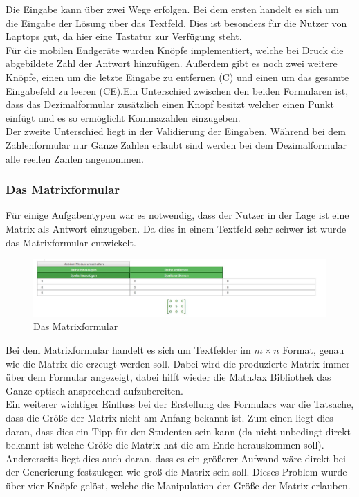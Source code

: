 Die Eingabe kann über zwei Wege erfolgen. Bei dem ersten handelt es sich um die Eingabe der Lösung über das Textfeld. Dies ist besonders für die Nutzer von Laptops gut, da hier eine Tastatur zur Verfügung steht. \\
Für die mobilen Endgeräte wurden Knöpfe implementiert, welche bei Druck die abgebildete Zahl der Antwort hinzufügen. Außerdem gibt es noch zwei weitere Knöpfe, einen um die letzte Eingabe zu entfernen (C) und einen um das gesamte Eingabefeld zu leeren (CE).Ein Unterschied zwischen den beiden Formularen ist, dass das Dezimalformular zusätzlich einen Knopf besitzt welcher einen Punkt einfügt und es so ermöglicht Kommazahlen einzugeben. \\
Der zweite Unterschied liegt in der Validierung der Eingaben. Während bei dem Zahlenformular nur Ganze Zahlen erlaubt sind werden bei dem Dezimalformular alle reellen Zahlen angenommen.

\subsubsection{Das Matrixformular}

Für einige Aufgabentypen war es notwendig, dass der Nutzer in der Lage ist eine Matrix als Antwort einzugeben. Da dies in einem Textfeld sehr schwer ist wurde das Matrixformular entwickelt. \\

\begin{figure}[htp]     %
\centering
\includegraphics[width=1\textwidth]{bilder/MatrixForm} 
\caption[Das Matrixformular]{Das Matrixformular}
\end{figure} 
Bei dem Matrixformular handelt es sich um Textfelder im $ m\times n$ Format, genau wie die Matrix die erzeugt werden soll. Dabei wird die produzierte Matrix immer über dem Formular angezeigt, dabei hilft wieder die MathJax Bibliothek das Ganze optisch ansprechend aufzubereiten. \\

Ein weiterer wichtiger Einfluss bei der Erstellung des Formulars war die Tatsache, dass die Größe der Matrix nicht am Anfang bekannt ist. Zum einen liegt dies daran, dass dies ein Tipp für den Studenten sein kann (da nicht unbedingt direkt bekannt ist welche Größe die Matrix hat die am Ende herauskommen soll). Andererseits liegt dies auch daran, dass es ein größerer Aufwand wäre direkt bei der Generierung festzulegen wie groß die Matrix sein soll. Dieses Problem wurde über vier Knöpfe gelöst, welche die Manipulation der Größe der Matrix erlauben. \\

